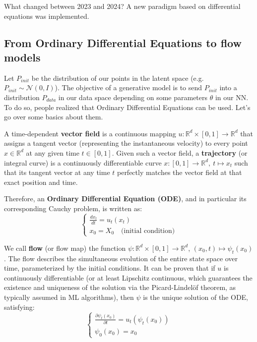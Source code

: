 What changed between 2023 and 2024? A new paradigm based on differential equations was implemented.

\subsection{From Ordinary Differential Equations to flow models}
Let $P_{init}$ be the distribution of our points in the latent space (e.g. $P_{init} \sim \mathcal{N}(0, I)$). The objective of a generative model is to send $P_{init}$ into a distribution $P_{data}$ in our data space depending on some parameters $\theta$ in our NN. To do so, people realized that Ordinary Differential Equations can be used. Let's go over some basics about them.

A time-dependent \textbf{vector field} is a continuous mapping $u: \mathbb{R}^d \times [0,1] \rightarrow \mathbb{R}^d$ that assigns a tangent vector (representing the instantaneous velocity) to every point $x \in \mathbb{R}^d$ at any given time $t \in [0,1]$. Given such a vector field, a \textbf{trajectory} (or integral curve) is a continuously differentiable curve $x: [0,1] \rightarrow \mathbb{R}^d, \ t \mapsto x_t$ such that its tangent vector at any time $t$ perfectly matches the vector field at that exact position and time. 

Therefore, an \textbf{Ordinary Differential Equation (ODE)}, and in particular its corresponding Cauchy problem, is written as:
\begin{equation}
    \begin{cases}
        \frac{dx_t}{dt} = u_t(x_t) \\
        x_0 = X_0 \quad \text{(initial condition)}
    \end{cases}
\end{equation}

We call \textbf{flow} (or flow map) the function $\psi: \mathbb{R}^d \times [0,1] \rightarrow \mathbb{R}^d$, $(x_0, t) \mapsto \psi_t(x_0)$. The flow describes the simultaneous evolution of the entire state space over time, parameterized by the initial conditions. It can be proven that if $u$ is continuously differentiable (or at least Lipschitz continuous, which guarantees the existence and uniqueness of the solution via the Picard-Lindelöf theorem, as typically assumed in ML algorithms), then $\psi$ is the unique solution of the ODE, satisfying:
\begin{equation}
    \begin{cases}
        \frac{\partial \psi_t(x_0)}{\partial t} = u_t(\psi_t(x_0)) \\
        \psi_0(x_0) = x_0
    \end{cases}
\end{equation}

